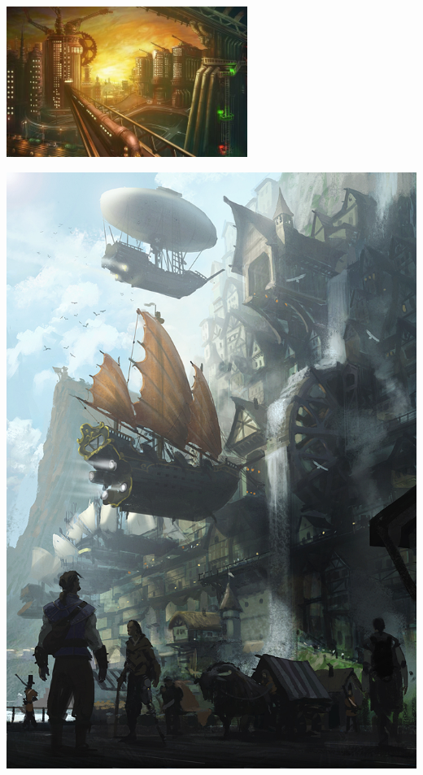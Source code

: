 \begin{minipage}{\textwidth}
\begin{minipage}[c]{.49\textwidth}
	\includegraphics[width=\linewidth, height= 4.9cm]{./images/Annexes/sshot50fd39fccf53c.jpg}
	\\[-1mm]
	\end{minipage}
	\hspace{.02\textwidth}
	\begin{minipage}[c]{.49\textwidth}
	\includegraphics[width=\linewidth]{./images/Annexes/tumblr_mdbq3rCn4e1r4zno6o1_1280.jpg}
	\\[-1mm]
	\end{minipage}

\end{minipage}



